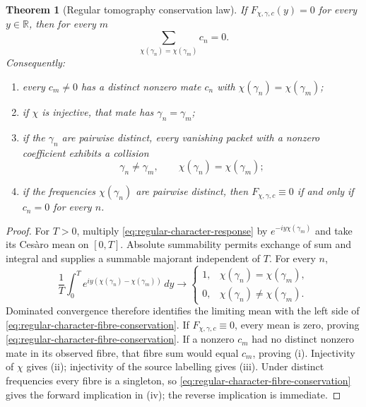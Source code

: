\documentclass[11pt]{article}
\newtheorem{theorem}{Theorem}[section]
\theoremstyle{definition}
\theoremstyle{remark}
\newcommand{\R}{\mathbb R}
\begin{document}
\begin{theorem}[Regular tomography conservation law]
\label{thm:regular-tomography-conservation}
If \(F_{\chi,\gamma,c}(y)=0\) for every \(y\in\R\), then for every \(m\)
\[
       \sum_{\chi(\gamma_n)=\chi(\gamma_m)}c_n=0.
\tag{2.T1}\label{eq:regular-character-fibre-conservation}
\]
Consequently:
\begin{enumerate}[label=\textup{(\roman*)},leftmargin=2.4em]
\item every \(c_m\ne0\) has a distinct nonzero mate \(c_n\) with
      \(\chi(\gamma_n)=\chi(\gamma_m)\);
\item if \(\chi\) is injective, that mate has
      \(\gamma_n=\gamma_m\);
\item if the \(\gamma_n\) are pairwise distinct, every vanishing packet with
      a nonzero coefficient exhibits a collision
      \[
          \gamma_n\ne\gamma_m,\qquad
          \chi(\gamma_n)=\chi(\gamma_m);
      \tag{2.T2}\label{eq:regular-tomography-collision}
      \]
\item if the frequencies \(\chi(\gamma_n)\) are pairwise distinct, then
      \(F_{\chi,\gamma,c}\equiv0\) if and only if \(c_n=0\) for every \(n\).
\end{enumerate}
\end{theorem}

\begin{proof}
For \(T>0\), multiply \eqref{eq:regular-character-response} by
\(e^{-iy\chi(\gamma_m)}\) and take its Ces\`aro mean on \([0,T]\).
Absolute summability permits exchange of sum and integral and supplies a
summable majorant independent of \(T\).  For every \(n\),
\[
 \frac1T\int_0^T
 e^{iy(\chi(\gamma_n)-\chi(\gamma_m))}\,dy
 \longrightarrow
 \begin{cases}
 1,&\chi(\gamma_n)=\chi(\gamma_m),\\
 0,&\chi(\gamma_n)\ne\chi(\gamma_m).
 \end{cases}
\]
Dominated convergence therefore identifies the limiting mean with the
left side of \eqref{eq:regular-character-fibre-conservation}.  If
\(F_{\chi,\gamma,c}\equiv0\), every mean is zero, proving
\eqref{eq:regular-character-fibre-conservation}.  If a nonzero \(c_m\) had
no distinct nonzero mate in its observed fibre, that fibre sum would equal
\(c_m\), proving (i).  Injectivity of \(\chi\) gives (ii); injectivity of the
source labelling gives (iii).  Under distinct frequencies every fibre is a
singleton, so \eqref{eq:regular-character-fibre-conservation} gives the
forward implication in (iv); the reverse implication is immediate.
\end{proof}
\end{document}
